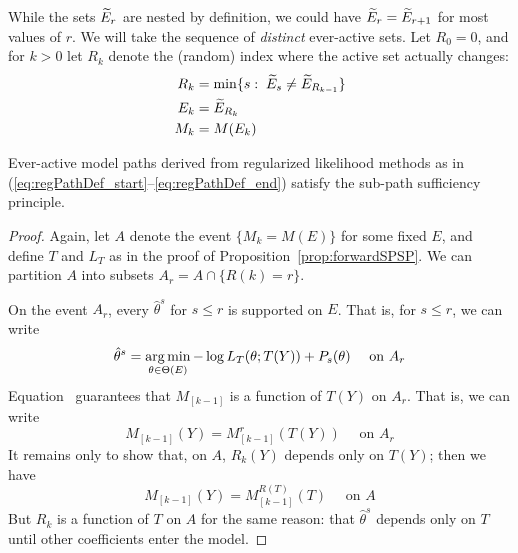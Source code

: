 \documentclass{article}
\begin{document}
While the sets $\widetilde{E}_r$ are nested by definition, we could have $\widetilde{E}_r = \widetilde{E}_{r+1}$ for most values of $r$. We will take the sequence of {\em distinct} ever-active sets. Let $R_0=0$, and for $k>0$ let $R_k$ denote the (random) index where the active set actually changes:
\begin{align}
  R_k &= \min\{s:\; \widetilde{E}_s \neq \widetilde{E}_{R_{k-1}}\}\\
  E_k &= \widetilde{E}_{R_k}\\
  \label{eq:regPathDef_end}
  M_k &= M(E_k)
\end{align}

\begin{proposition}\label{prop:regPathSPSP}
Ever-active model paths derived from regularized likelihood methods as in (\ref{eq:regPathDef_start}--\ref{eq:regPathDef_end}) satisfy the sub-path sufficiency principle.
\end{proposition}

\begin{proof}
  Again, let $A$ denote the event $\{M_k = M(E)\}$ for some fixed $E$, and define $T$ and $L_T$ as in the proof of Proposition~\ref{prop:forwardSPSP}. We can partition $A$ into subsets $A_r = A \cap \{R(k)=r\}$.

On the event $A_r$, every $\hat\theta^s$ for $s\leq r$ is supported on $E$. That is, for $s \leq r$, we can write 
\begin{equation}\label{eq:onlyT_Ar}
  \hat\theta^{s} = 
  \operatorname*{arg\,min}_{\theta\in\Theta(E)} -\log L_T(\theta; T(Y)) + P_s(\theta) \quad \text{ on } A_r
\end{equation}
Equation~\label{eq:onlyT_Ar} guarantees that $M_{[k-1]}$ is a function of $T(Y)$ on $A_r$. That is, we can write
\[
M_{[k-1]}(Y) = M_{[k-1]}^r(T(Y)) \quad \text{ on } A_r
\]
It remains only to show that, on $A$, $R_k(Y)$ depends only on $T(Y)$; then we have
\[
M_{[k-1]}(Y) = M_{[k-1]}^{R(T)}(T) \quad \text{ on } A
\]
But $R_k$ is a function of $T$ on $A$ for the same reason: that $\hat\theta^s$ depends only on $T$ until other coefficients enter the model.
\end{proof}

\end{document}
